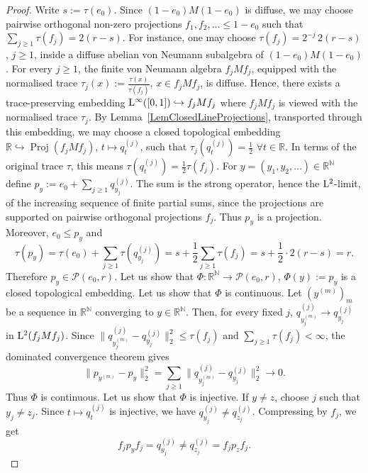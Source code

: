 \documentclass[12pt]{amsart} %
\theoremstyle{plain}
\theoremstyle{definition}
\newcommand{\R}{\mathbb{R}}
\newcommand{\N}{\mathbb{N}}
\DeclareMathOperator{\Proj}{Proj}
\begin{document}
\begin{proof}
Write $s:=\tau(e_0)$. Since \((1-e_0)M(1-e_0)\) is diffuse, we may choose pairwise orthogonal non-zero
projections $ f_1,f_2,\dots\leq 1-e_0$ such that $\sum_{j\geq1}\tau(f_j)=2(r-s)$. For instance, one may choose $\tau(f_j)=2^{-j}\,2(r-s)$,  $j\geq1$, inside a diffuse abelian von Neumann subalgebra of $(1-e_0)M(1-e_0)$. For every \(j\geq1\), the finite von Neumann algebra \(f_jMf_j\), equipped with the
normalised trace $\tau_j(x):=\frac{\tau(x)}{\tau(f_j)}$, $x\in f_jMf_j$, is diffuse. Hence,
there exists a trace-preserving embedding ${\rm L}^\infty([0,1])\hookrightarrow f_jMf_j$ where \(f_jMf_j\) is viewed with the normalised trace \(\tau_j\). By Lemma~\ref{LemClosedLineProjections}, transported through this embedding, we may choose a closed topological embedding $\mathbb R\hookrightarrow \Proj(f_jMf_j)$, $t\mapsto q_t^{(j)}$, such that $\tau_j(q_t^{(j)})=\frac12$ $\forall t\in\mathbb R$. In terms of the original trace \(\tau\), this means $\tau(q_t^{(j)})=\frac12\tau(f_j)$. For $y=(y_1,y_2,\dots)\in\mathbb R^{\mathbb N}$ define $p_y:=e_0+\sum_{j\geq1}q_{y_j}^{(j)}$. The sum is the strong operator, hence the \({\rm L}^2\)-limit, of the increasing sequence of
finite partial sums, since the projections are supported on pairwise orthogonal
projections \(f_j\). Thus \(p_y\) is a projection. Moreover, $e_0\leq p_y$ and
\[
        \tau(p_y)
        =
        \tau(e_0)+\sum_{j\geq1}\tau(q_{y_j}^{(j)})
        =
        s+\frac12\sum_{j\geq1}\tau(f_j)
        =
        s+\frac12\cdot 2(r-s)
        =
        r.
\]
Therefore $p_y\in\mathcal P(e_0,r)$. Let us show that $\Phi:\mathbb R^{\mathbb N}\rightarrow \mathcal P(e_0,r)$, $\Phi(y):=p_y$ is a closed topological embedding.
\medskip
\noindent Let us show that \(\Phi\) is continuous. Let $(y^{(m)})_m$ be a sequence in $\R^\N$ converging to $y\in\R^\N$. Then, for every fixed \(j\), $q_{y^{(m)}_j}^{(j)}\to q_{y_j}^{(j)}$ in ${\rm L}^2(f_jMf_j)$. Since $\|q_{y^{(m)}_j}^{(j)}-q_{y_j}^{(j)}\|_2^2
\leq \tau(f_j)$ and $\sum_{j\geq1}\tau(f_j)<\infty$, the dominated convergence theorem gives
\[
        \|p_{y^{(m)}}-p_y\|_2^2
        =
        \sum_{j\geq1}
        \|q_{y^{(m)}_j}^{(j)}-q_{y_j}^{(j)}\|_2^2
        \longrightarrow 0.
\]
Thus \(\Phi\) is continuous.
\medskip
\noindent Let us show that \(\Phi\) is injective. If \(y\neq z\), choose \(j\) such that $y_j\neq z_j$. Since $t\mapsto q_t^{(j)}$ is injective, we have $q_{y_j}^{(j)}\neq q_{z_j}^{(j)}$. Compressing by \(f_j\), we get
\[
        f_jp_yf_j=q_{y_j}^{(j)}
        \neq
        q_{z_j}^{(j)}=f_jp_zf_j.
\]
\end{proof}
\end{document}
